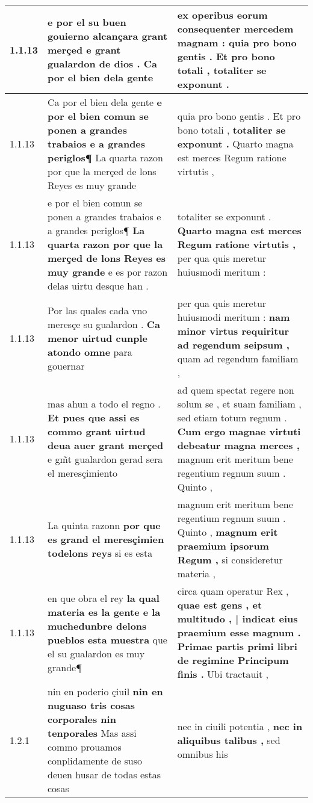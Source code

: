 \begin{tabular}{|p{1cm}|p{6.5cm}|p{6.5cm}|}
1.1.13 & e por el su buen gouierno \textbf{ alcançara grant merçed e grant gualardon de dios . } Ca por el bien dela gente & ex operibus eorum consequenter mercedem magnam : \textbf{ quia pro bono gentis . Et pro bono totali , } totaliter se exponunt . \\\hline
1.1.13 & Ca por el bien dela gente \textbf{ e por el bien comun se ponen a grandes trabaios e a grandes periglos¶ } La quarta razon por que la merçed de lons Reyes es muy grande & quia pro bono gentis . Et pro bono totali , \textbf{ totaliter se exponunt . } Quarto magna est merces Regum ratione virtutis , \\\hline
1.1.13 & e por el bien comun se ponen a grandes trabaios e a grandes periglos¶ \textbf{ La quarta razon por que la merçed de lons Reyes es muy grande } e es por razon delas uirtu desque han . & totaliter se exponunt . \textbf{ Quarto magna est merces Regum ratione virtutis , } per qua quis meretur huiusmodi meritum : \\\hline
1.1.13 & Por las quales cada vno meresçe su gualardon . \textbf{ Ca menor uirtud cunple atondo omne } para gouernar & per qua quis meretur huiusmodi meritum : \textbf{ nam minor virtus requiritur ad regendum seipsum , } quam ad regendum familiam , \\\hline
1.1.13 & mas ahun a todo el regno . \textbf{ Et pues que assi es commo grant uirtud deua auer grant merçed } e gm̃t gualardon gerad sera el meresçimiento & ad quem spectat regere non solum se , et suam familiam , sed etiam totum regnum . \textbf{ Cum ergo magnae virtuti debeatur magna merces , } magnum erit meritum bene regentium regnum suum . Quinto , \\\hline
1.1.13 & La quinta razonn \textbf{ por que es grand el meresçimien todelons reys } si es esta & magnum erit meritum bene regentium regnum suum . Quinto , \textbf{ magnum erit praemium ipsorum Regum , } si consideretur materia , \\\hline
1.1.13 & en que obra el rey \textbf{ la qual materia es la gente e la muchedunbre delons pueblos esta muestra } que el su gualardon es muy grande¶ & circa quam operatur Rex , \textbf{ quae est gens , et multitudo , | indicat eius praemium esse magnum . Primae partis primi libri de regimine Principum finis . } Ubi tractauit , \\\hline
1.2.1 & nin en poderio çiuil \textbf{ nin en nuguaso tris cosas corporales nin tenporales } Mas assi commo prouamos conplidamente de suso deuen husar de todas estas cosas & nec in ciuili potentia , \textbf{ nec in aliquibus talibus , } sed omnibus his \\\hline

\end{tabular}
